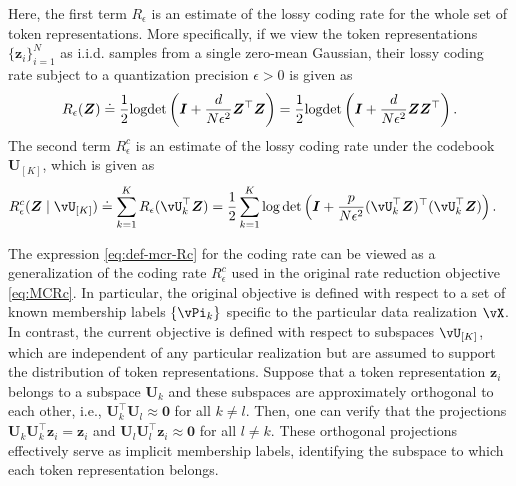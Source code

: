 \documentclass[\toplevelprefix/book-main.tex]{subfiles}
\begin{document}
Here, the first term $R_{\epsilon}$ is an estimate of the lossy coding rate for the whole set of token representations. More specifically, if we view the token representations $\{\bm z_i\}_{i=1}^N$ as i.i.d. samples from a single zero-mean Gaussian, their lossy coding rate subject to a quantization precision $\epsilon > 0$ is given as
\begin{equation}\label{eq:coding_rate}
    R_{\epsilon}(\bm{Z}) \doteq \frac{1}{2}\textrm{logdet}\left(\bm{I} + \frac{d}{N\epsilon^{2}}\bm{Z}^{\top}\bm{Z}\right) = \frac{1}{2}\textrm{logdet}\left(\bm{I} + \frac{d}{N\epsilon^{2}}\bm{Z}\bm{Z}^{\top}\right).
\end{equation}
The second term $R_{\epsilon}^c$ is an estimate of the lossy coding rate under the codebook $\bm U_{[K]}$, which is given as 
\begin{equation}
\begin{aligned}
    R_{\epsilon}^c(\Z \mid \vU_{[K]}) &\doteq \sum_{k=1}^{K}R_{\epsilon}(\vU_k^{\top} \Z) = \frac{1}{2}\sum_{k=1}^{K}\log\det\left(\I +
    \frac{p}{N\epsilon^{2}}(\vU_k^{\top}\Z)^{\top}(\vU_k^{\top}\Z)\right).
\end{aligned}
\label{eq:def-mcr-Rc}
\end{equation}

\begin{remark}
    The expression \eqref{eq:def-mcr-Rc} for the coding rate can be viewed as a generalization of the coding rate \(R_\epsilon^{c}\) used in the original rate reduction objective \eqref{eq:MCRc}. In particular, the original objective is defined with respect to a set of known membership labels \(\{\vPi_{k}\}\) specific to the particular data realization \(\vX\). In contrast, the current objective is defined with respect to subspaces \(\vU_{[K]}\), which are independent of any particular realization but are assumed to support the distribution of token representations. Suppose that a token representation $\bm z_i$ belongs to a subspace $\bm U_k$ and these subspaces are approximately orthogonal to each other, i.e., $\bm U_k^\top \bm U_l \approx \bm 0$ for all $k \neq l$. Then, one can verify that the projections $\bm U_k\bm U_k^\top \bm z_i  = \bm z_i$ and  $\bm U_l\bm U_l^\top \bm z_i \approx \bm 0$ for all $l \neq k$. These orthogonal projections effectively serve as implicit membership labels, identifying the subspace to which each token representation belongs. 
\end{remark}
\end{document}
